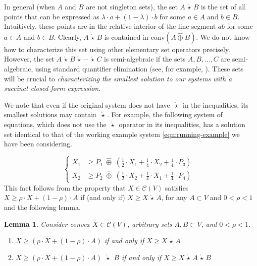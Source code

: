 \documentclass[10pt]{amsart}
\theoremstyle{plain}
\newtheorem{lemma}{Lemma}[section]
\theoremstyle{definition}
\providecommand{\cC}[0]{\ensuremath{\mathcal C}\xspace}
\let\geq\geqslant
\providecommand{\cplus}[0]{\ensuremath{\hat{\oplus}}\xspace}
\providecommand{\cmult}[0]{\ensuremath{{\,\mathring{\star}\,}}\xspace}
\providecommand{\conv}[1]{\ensuremath{\mathrm{conv}{\left({#1}\right)}\xspace}}
\providecommand{\convset}[0]{\ensuremath{\cC}\xspace}
\begin{document}
In general (when $A$ and $B$ are not singleton sets), the set $A\cmult B$ is the set of all points that can be expressed as $\lambda\cdot a + (1-\lambda)\cdot b$ for some $a\in A$ and $b\in B$. 
Intuitively, these points are in the relative interior of the line segment $\overline{ab}$ for some $a\in A$ and $b\in B$. 
Clearly, $A\cmult B$ is contained in $\conv{A\cplus B}$.
We do not know how to characterize this set using other elementary set operators precisely. 
However, the set $A\cmult B\cmult \dotsi \cmult C$ is semi-algebraic if the sets $A, B,\dotsc, C$ are semi-algebraic, using standard quantifier elimination (see, for example, \cite[Chapter 14]{BPRbook2}).
These sets will be crucial to {\em characterizing the smallest solution to our systems with a succinct closed-form expression}. 

We note that even if the original system does not have $\cmult$ in the inequalities, its smallest solutions may contain $\cmult$.
For example, the following system of equations, which does not use the $\cmult$ operator in its inequalities, has a solution set identical to that of the working example system \eqref {eqn:running-example} we have been considering. 

\begin{equation}
\left\{
\begin{aligned}
    X_1 &\geq P_1  \;\cplus\;  \left(\frac12\cdot X_1 + \frac14\cdot X_2 + \frac14\cdot P_3\right)\\
    X_2 &\geq P_2  \;\cplus\;  \left(\frac12\cdot X_2 + \frac14\cdot X_1 + \frac14\cdot P_4\right)
\end{aligned}
\right.
\end{equation}
This fact follows from the property that $X\in \convset(V)$ satisfies $X\geq \rho\cdot X + (1-\rho)\cdot A$ if (and only if) $X\geq X\cmult A$, for any $A\subset V$ and $0<\rho<1$ 
and the following lemma.

\begin{lemma}
\label{lem:pullout-X}
Consider convex $X\in\convset(V)$, arbitrary sets $A,B\subset V$, and $0<\rho<1$.
\begin{enumerate}[1.]
\item
\label{itemlabel:lem:pullout-X:1}
$X\geq (\rho\cdot X + (1-\rho)\cdot A)$ if and only if $X\geq X\cmult A$
\item 
\label{itemlabel:lem:pullout-X:2}
$X\geq (\rho\cdot X + (1-\rho)\cdot A) \;\cmult\; B$ if and only if $X\geq X\cmult A\cmult B$
\end{enumerate}
\end{lemma}
\end{document}
